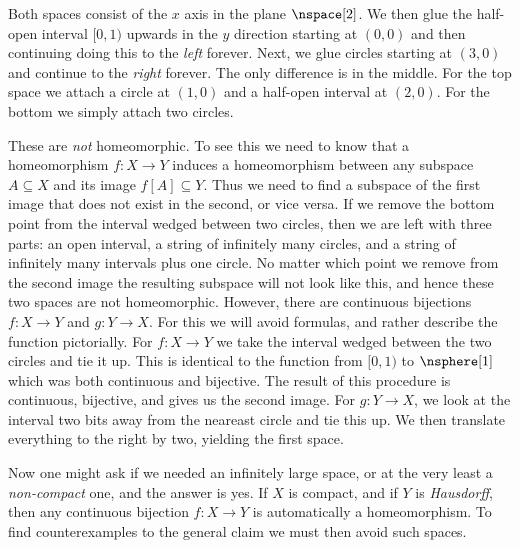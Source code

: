         Both spaces consist of the $x$ axis in the plane $\nspace[2]$.
        We then glue the half-open interval $[0,1)$ upwards in the $y$
        direction starting at $(0,0)$ and then continuing doing this to
        the \textit{left} forever. Next, we glue circles starting at
        $(3,0)$ and continue to the \textit{right} forever. The only
        difference is in the middle. For the top space we attach a circle
        at $(1,0)$ and a half-open interval at $(2,0)$. For the bottom
        we simply attach two circles.
        \par\hfill\par
        These are \textit{not} homeomorphic. To see this we need to know
        that a homeomorphism $f:X\rightarrow{Y}$ induces a
        homeomorphism between any subspace $A\subseteq{X}$ and its image
        $f[A]\subseteq{Y}$. Thus we need to find a subspace of the first
        image that does not exist in the second, or vice versa. If we
        remove the bottom point from the interval wedged between two
        circles, then we are left with three parts: an open interval,
        a string of infinitely many circles, and a string of infinitely
        many intervals plus one circle. No matter which point we remove
        from the second image the resulting subspace will not look like
        this, and hence these two spaces are not homeomorphic. However,
        there are continuous bijections $f:X\rightarrow{Y}$ and
        $g:Y\rightarrow{X}$. For this we will avoid formulas, and rather
        describe the function pictorially. For $f:X\rightarrow{Y}$ we
        take the interval wedged between the two circles and tie it up.
        This is identical to the function from $[0,1)$ to $\nsphere[1]$
        which was both continuous and bijective. The result of this
        procedure is continuous, bijective, and gives us the second
        image. For $g:Y\rightarrow{X}$, we look at the interval two bits
        away from the neareast circle and tie this up. We then translate
        everything to the right by two, yielding the first space.
        \par\hfill\par
        Now one might ask if we needed an infinitely large space, or at
        the very least a \textit{non-compact} one, and the answer is
        yes. If $X$ is compact, and if $Y$ is \textit{Hausdorff}, then
        any continuous bijection $f:X\rightarrow{Y}$ is automatically a
        homeomorphism. To find counterexamples to the general claim we
        must then avoid such spaces.
